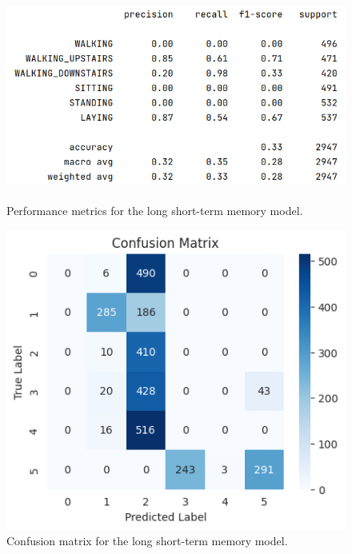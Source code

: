 \begin{figure}[ht]
    \centering
    \begin{minipage}{0.45\textwidth}
        \centering
        \includegraphics[width=\textwidth]{./img/lstm/performance-metrics}
        \caption{Performance metrics for the long short-term memory model.}
        \label{fig:lstm-performance-metrics}
    \end{minipage}\hfill
    \begin{minipage}{0.45\textwidth}
        \centering
        \includegraphics[width=\textwidth]{./img/lstm/confusion-matrix}
        \caption{Confusion matrix for the long short-term memory model.}
        \label{fig:lstm-confusion-matrix}
    \end{minipage}
\end{figure}

